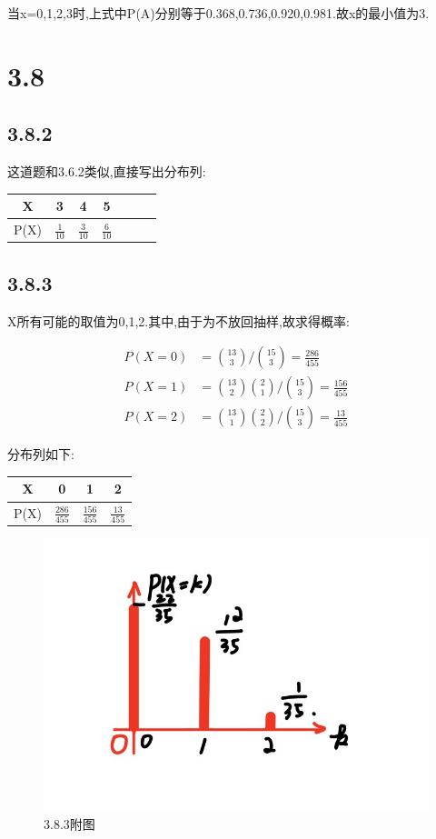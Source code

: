 \documentclass[12pt,a4paper,fontset=none]{ctexart}
\begin{document}
当x=0,1,2,3时,上式中P(A)分别等于0.368,0.736,0.920,0.981.故x的最小值为3.

\section*{3.8}
\subsection*{3.8.2}
这道题和3.6.2类似,直接写出分布列:

\begin{center}
	\begin{tabular}{|c|c|c|c|c|c|c|}
		\hline
		X    & 3               & 4               & 5               \\
		\hline
		P(X) & $\frac{1}{10} $ & $\frac{3}{10} $ & $\frac{6}{10} $ \\
		\hline
	\end{tabular}
\end{center}
\subsection*{3.8.3}
X所有可能的取值为0,1,2.其中,由于为不放回抽样,故求得概率:

\begin{align*}
	P(X=0) & =\binom{13}{3}/\binom{15}{3}=\frac{286}{455}             \\
	P(X=1) & =\binom{13}{2}\binom{2}{1}/\binom{15}{3}=\frac{156}{455} \\
	P(X=2) & =\binom{13}{1}\binom{2}{2}/\binom{15}{3}=\frac{13}{455}
\end{align*}

分布列如下:

\begin{center}
	\begin{tabular}{|c|c|c|c|}
		\hline
		X    & 0                  & 1                  & 2                 \\
		\hline
		P(X) & $\frac{286}{455} $ & $\frac{156}{455} $ & $\frac{13}{455} $ \\
		\hline
	\end{tabular}
\end{center}

\begin{figure}[H]
	\centering
	\includegraphics[width=0.7\linewidth]{习题图.jpg}
	\caption{3.8.3附图}
\end{figure}
\end{document}
